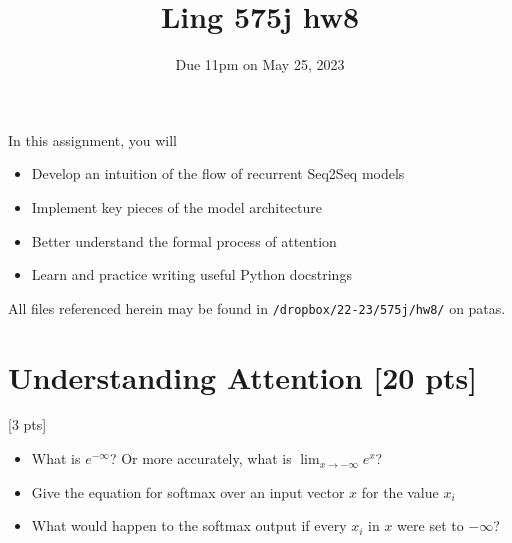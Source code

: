 \documentclass[11pt]{article}
\begin{document}
\title{Ling 575j hw8}
\date{\vspace{-0.2in}Due 11pm on May 25, 2023}
\maketitle


\noindent In this assignment, you will 
\begin{itemize}
  \item Develop an intuition of the flow of recurrent Seq2Seq models
  \item Implement key pieces of the model architecture
  \item Better understand the formal process of attention
  \item Learn and practice writing useful Python docstrings
\end{itemize}
All files referenced herein may be found in \texttt{/dropbox/22-23/575j/hw8/} on patas.


\section{Understanding Attention [20 pts]}

 \hfill [3 pts]
\begin{itemize}
  \item What is $e^{-\infty}$? Or more accurately, what is $\lim_{x \to -\infty} e^x$?
  \item Give the equation for softmax over an input vector $x$ for the value $x_i$
  \item What would happen to the softmax output if every $x_i$ in $x$ were set to $-\infty$?
\end{itemize}
\end{document}
